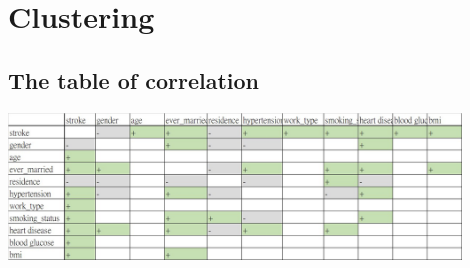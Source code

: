 \chapter{Clustering}
\section{The table of correlation}
\begin{center}
    \includegraphics[width=12cm]{./images/all_vari_corre.jpg}
\end{center}